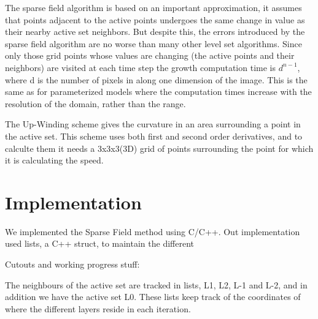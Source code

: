 The sparse field algorithm is based on an important approximation, it assumes that points adjacent to the active points undergoes the same change in value as their nearby active set neighbors. But despite this, the errors introduced by the sparse field algorithm are no worse than many other level set algorithms. Since only those grid points whose values are changing (the active points and their neighbors) are visited at each time step the growth computation time is \(d^{n-1}\), where d is the number of pixels in along one dimension of the image. This is the same as for parameterized models where the computation times increase with the resolution of the domain, rather than the range. 



The Up-Winding scheme gives the curvature in an area surrounding a point in the active set. This scheme uses both first and second order derivatives, and to calculte them it needs a 3x3x3(3D) grid of points surrounding the point for which it is calculating the speed. 


\section{Implementation}

We implemented the Sparse Field method using C/C++. Out implementation used lists, a C++ struct, to maintain the different




Cutouts and working progress stuff:

The neighbours of the active set are tracked in lists, L1, L2, L-1 and L-2, and in addition we have the active set L0. These lists keep track of the coordinates of where the different layers reside in each iteration. 





